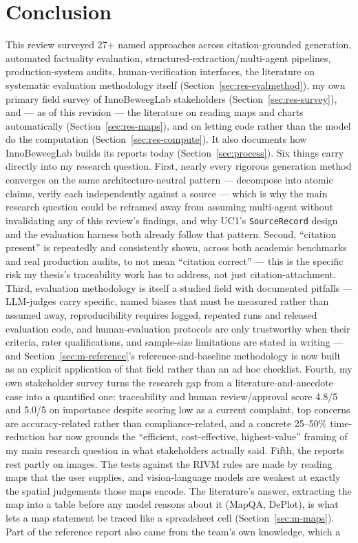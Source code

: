 \section{Conclusion}\label{sec:conclusion}

This review surveyed 27+ named approaches across citation-grounded generation, automated factuality evaluation, structured-extraction/multi-agent pipelines, production-system audits, human-verification interfaces, the literature on systematic evaluation methodology itself (Section~\ref{sec:res-evalmethod}), my own primary field survey of InnoBeweegLab stakeholders (Section~\ref{sec:res-survey}), and — as of this revision — the literature on reading maps and charts automatically (Section~\ref{sec:res-maps}), and on letting code rather than the model do the computation (Section~\ref{sec:res-compute}). It also documents how InnoBeweegLab builds its reports today (Section~\ref{sec:process}). Six things carry directly into my research question. First, nearly every rigorous generation method converges on the same architecture-neutral pattern — decompose into atomic claims, verify each independently against a source — which is why the main research question could be reframed away from assuming multi-agent without invalidating any of this review's findings, and why UC1's \texttt{SourceRecord} design and the evaluation harness both already follow that pattern. Second, \textquotedblleft{}citation present\textquotedblright{} is repeatedly and consistently shown, across both academic benchmarks and real production audits, to not mean \textquotedblleft{}citation correct\textquotedblright{} — this is the specific risk my thesis's traceability work has to address, not just citation-attachment. Third, evaluation methodology is itself a studied field with documented pitfalls — LLM-judges carry specific, named biases that must be measured rather than assumed away, reproducibility requires logged, repeated runs and released evaluation code, and human-evaluation protocols are only trustworthy when their criteria, rater qualifications, and sample-size limitations are stated in writing — and Section~\ref{sec:m-reference}'s reference-and-baseline methodology is now built as an explicit application of that field rather than an ad hoc checklist. Fourth, my own stakeholder survey turns the research gap from a literature-and-anecdote case into a quantified one: traceability and human review/approval score 4.8/5 and 5.0/5 on importance despite scoring low as a current complaint, top concerns are accuracy-related rather than compliance-related, and a concrete 25–50\% time-reduction bar now grounds the \textquotedblleft{}efficient, cost-effective, highest-value\textquotedblright{} framing of my main research question in what stakeholders actually said. Fifth, the reports rest partly on images. The tests against the RIVM rules are made by reading maps that the user supplies, and vision-language models are weakest at exactly the spatial judgements those maps encode. The literature's answer, extracting the map into a table before any model reasons about it (MapQA, DePlot), is what lets a map statement be traced like a spreadsheet cell (Section~\ref{sec:m-maps}). Part of the reference report also came from the team's own knowledge, which a 